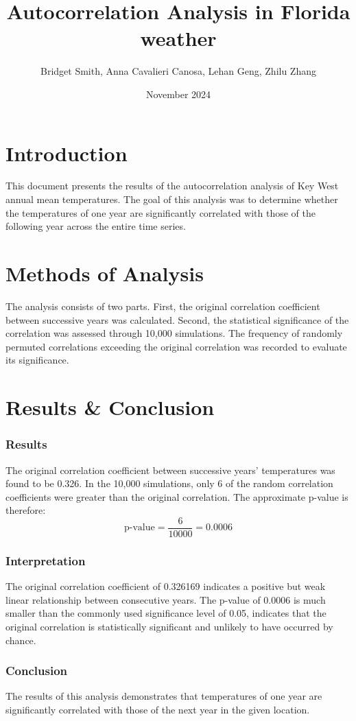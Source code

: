 \documentclass{article}
\title{Autocorrelation Analysis in Florida weather}
\author{Bridget Smith, Anna Cavalieri Canosa, Lehan Geng, Zhilu Zhang}
\date{November 2024}
\begin{document}
\maketitle

 \section{Introduction}
 \vspace{-0.5em}
This document presents the results of the autocorrelation analysis of Key West annual mean temperatures. The goal of this analysis was to determine whether the temperatures of one year are significantly correlated with those of the following year across the entire time series.

\section{Methods of Analysis}
\vspace{-0.5em}
The analysis consists of two parts. First, the original correlation coefficient between successive years was calculated. Second, the statistical significance of the correlation was assessed through 10,000 simulations. The frequency of randomly permuted correlations exceeding the original correlation was recorded to evaluate its significance.
\section{Results \& Conclusion}
\vspace{-0.5em}
{\selectfont\subsubsection*{Results}
\vspace{-0.5em}
The original correlation coefficient between successive years' temperatures was found to be 0.326. In the 10,000 simulations, only 6 of the random correlation coefficients were greater than the original correlation. The approximate p-value is therefore:
\vspace{-0.5em}
\[
\text{p-value} = \frac{6}{10000} = 0.0006
\]}

{\selectfont\subsubsection*{Interpretation}
The original correlation coefficient of 0.326169 indicates a positive but weak linear relationship between consecutive years.
The p-value of 0.0006 is much smaller than the commonly used significance level of 0.05, indicates that the original correlation is statistically significant and unlikely to have occurred by chance.}

{\selectfont\subsubsection*{Conclusion}
The results of this analysis demonstrates that temperatures of one year are significantly correlated with those of the next year in the given location.}
\end{document}

